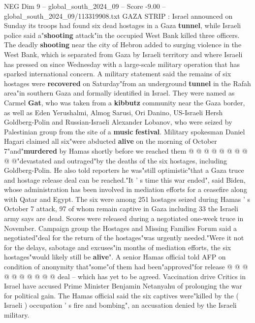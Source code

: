 \begin{textsample}{NEG Dim 9 – global\_south\_2024\_09 – Score -9.00 – global\_south\_2024\_09/113319908.txt}  \label{ex:f9_neg_105}
GAZA STRIP : Israel announced on Sunday its troops had found six dead hostages in a Gaza \textbf{tunnel}, while Israeli police said a"\textbf{shooting} attack"in the occupied West Bank killed three officers.
The deadly \textbf{shooting} near the city of Hebron added to surging violence in the West Bank, which is separated from Gaza by Israeli territory and where Israeli has pressed on since Wednesday with a large-scale military operation that has sparked international concern.
A military statement said the remains of six hostages were \textbf{recovered} on Saturday"from an underground \textbf{tunnel} in the Rafah area"in southern Gaza and formally identified in Israel.
They were named as Carmel \textbf{Gat}, who was taken from a \textbf{kibbutz} community near the Gaza border, as well as Eden Yerushalmi, Almog Sarusi, Ori Danino, US-Israeli Hersh Goldberg-Polin and Russian-Israeli Alexander Lobanov, who were seized by Palestinian group from the site of a \textbf{music} \textbf{festival}.
Military spokesman Daniel Hagari claimed all six"were abducted \textbf{alive} on the morning of October 7"and"\textbf{murdered} by Hamas shortly before we reached them @ @ @ @ @ @ @ @ @ @"devastated and outraged"by the deaths of the six hostages, including Goldberg-Polin.
He also told reporters he was"still optimistic"that a Gaza truce and hostage release deal can be reached."It ' s time this war ended", said Biden, whose administration has been involved in mediation efforts for a ceasefire along with Qatar and Egypt.
The six were among 251 hostages seized during Hamas ' s October 7 attack, 97 of whom remain captive in Gaza including 33 the Israeli army says are dead.
Scores were released during a negotiated one-week truce in November.
Campaign group the Hostages and Missing Families Forum said a negotiated"deal for the return of the hostages"was urgently needed."Were it not for the delays, sabotage and excuses"in months of mediation efforts, the six hostages"would likely still be \textbf{alive}".
A senior Hamas official told AFP on condition of anonymity that"some"of them had been"approved"for release @ @ @ @ @ @ @ @ @ @ deal -- which has yet to be agreed.
Vaccination drive Critics in Israel have accused Prime Minister Benjamin Netanyahu of prolonging the war for political gain.
The Hamas official said the six captives were"killed by the ( Israeli ) occupation ' s fire and bombing", an accusation denied by the Israeli military.

\end{textsample}
